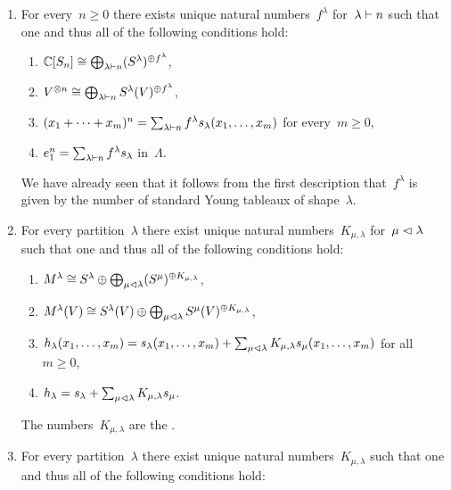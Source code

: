 \documentclass[a4paper,10pt]{scrartcl}
\begin{document}
\begin{example}
  \leavevmode
  \begin{enumerate}
    \item
      For every~$n \geq 0$ there exists unique natural numbers~$f^\lambda$ for~$\lambda \vdash n$ such that one and thus all of the following conditions hold:
      \begin{enumerate}
        \item
          $\mathbb{C}[S_n] \cong \bigoplus_{\lambda \vdash n} (S^\lambda)^{\oplus f^\lambda}$,
        \item
          $V^{\otimes n} \cong \bigoplus_{\lambda \vdash n} S^\lambda(V)^{\oplus f^\lambda}$,
        \item
          $(x_1 + \dotsb + x_m)^n = \sum_{\lambda \vdash n} f^\lambda s_\lambda(x_1, \dotsc, x_m)$ for every~$m \geq 0$,
        \item
          $e_1^n = \sum_{\lambda \vdash n} f^\lambda s_\lambda$ in~$\Lambda$.
      \end{enumerate}
      We have already seen that it follows from the first description that~$f^\lambda$ is given by the number of standard Young tableaux of shape~$\lambda$.
    \item
      For every partition~$\lambda$ there exist unique natural numbers~$K_{\mu, \lambda}$ for~$\mu \vartriangleleft \lambda$ such that one and thus all of the following conditions hold:
      \begin{enumerate}
        \item
          $M^\lambda \cong S^\lambda \oplus \bigoplus_{\mu \vartriangleleft \lambda} (S^\mu)^{\oplus K_{\mu, \lambda}}$,
        \item
          $M^\lambda(V) \cong S^\lambda(V) \oplus \bigoplus_{\mu \vartriangleleft \lambda} S^\mu(V)^{\oplus K_{\mu, \lambda}}$,
        \item
          $h_\lambda(x_1, \dotsc, x_m) = s_\lambda(x_1, \dotsc, x_m) + \sum_{\mu \vartriangleleft \lambda} K_{\mu, \lambda} s_\mu(x_1, \dotsc, x_m)$ for all~$m \geq 0$,
        \item
          $h_\lambda = s_\lambda + \sum_{\mu \vartriangleleft \lambda} K_{\mu, \lambda} s_\mu$.
      \end{enumerate}
      The numbers~$K_{\mu, \lambda}$ are the .
    \item
      For every partition~$\lambda$ there exist unique natural numbers~$K_{\mu, \lambda}$ such that one and thus all of the following conditions hold:
      \begin{enumerate}

\end{enumerate}
\end{enumerate}
\end{example}
\end{document}
